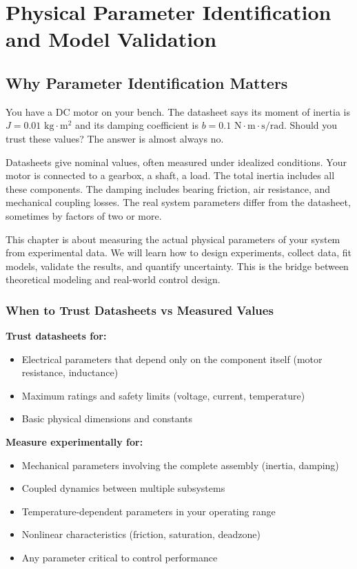 \chapter{Physical Parameter Identification and Model Validation}
\label{ch:parameter_identification}

\section{Why Parameter Identification Matters}

You have a DC motor on your bench. The datasheet says its moment of inertia is $J = 0.01 \text{ kg}\cdot\text{m}^2$ and its damping coefficient is $b = 0.1 \text{ N}\cdot\text{m}\cdot\text{s/rad}$. Should you trust these values? The answer is almost always no.

Datasheets give nominal values, often measured under idealized conditions. Your motor is connected to a gearbox, a shaft, a load. The total inertia includes all these components. The damping includes bearing friction, air resistance, and mechanical coupling losses. The real system parameters differ from the datasheet, sometimes by factors of two or more.

This chapter is about measuring the actual physical parameters of your system from experimental data. We will learn how to design experiments, collect data, fit models, validate the results, and quantify uncertainty. This is the bridge between theoretical modeling and real-world control design.

\subsection{When to Trust Datasheets vs Measured Values}

\textbf{Trust datasheets for:}
\begin{itemize}
    \item Electrical parameters that depend only on the component itself (motor resistance, inductance)
    \item Maximum ratings and safety limits (voltage, current, temperature)
    \item Basic physical dimensions and constants
\end{itemize}

\textbf{Measure experimentally for:}
\begin{itemize}
    \item Mechanical parameters involving the complete assembly (inertia, damping)
    \item Coupled dynamics between multiple subsystems
    \item Temperature-dependent parameters in your operating range
    \item Nonlinear characteristics (friction, saturation, deadzone)
    \item Any parameter critical to control performance
\end{itemize}

